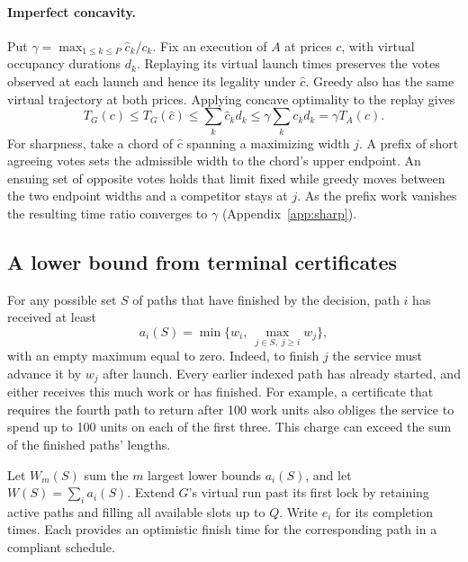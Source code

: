 \documentclass{article}
\begin{document}
\paragraph{Imperfect concavity.} Put $\gamma=\max_{1\le k\le P}\widehat c_k/c_k$. Fix an execution of $A$ at prices $c$, with virtual occupancy durations $d_k$. Replaying its virtual launch times preserves the votes observed at each launch and hence its legality under $\widehat c$. Greedy also has the same virtual trajectory at both prices. Applying concave optimality to the replay gives
\[
 T_G(c)\le T_G(\widehat c)\le \sum_k\widehat c_k d_k
 \le \gamma \sum_k c_k d_k=\gamma T_A(c).
\]
For sharpness, take a chord of $\widehat c$ spanning a maximizing width $j$. A prefix of short agreeing votes sets the admissible width to the chord's upper endpoint. An ensuing set of opposite votes holds that limit fixed while greedy moves between the two endpoint widths and a competitor stays at $j$. As the prefix work vanishes the resulting time ratio converges to $\gamma$ (Appendix~\ref{app:sharp}).

\subsection{A lower bound from terminal certificates}\label{sec:lb}
For any possible set \(S\) of paths that have finished by the decision, path \(i\) has received at least
\begin{equation}
 a_i(S)=\min\{w_i,\ \max_{j\in S,\;j\ge i} w_j\},
 \label{eq:work}
\end{equation}
with an empty maximum equal to zero. Indeed, to finish \(j\) the service must advance it by \(w_j\) after launch. Every earlier indexed path has already started, and either receives this much work or has finished. For example, a certificate that requires the fourth path to return after 100 work units also obliges the service to spend up to 100 units on each of the first three. This charge can exceed the sum of the finished paths' lengths.

Let \(W_m(S)\) sum the \(m\) largest lower bounds \(a_i(S)\), and let \(W(S)=\sum_i a_i(S)\). Extend \(G\)'s virtual run past its first lock by retaining active paths and filling all available slots up to \(Q\). Write \(e_i\) for its completion times. Each provides an optimistic finish time for the corresponding path in a compliant schedule.
\end{document}
